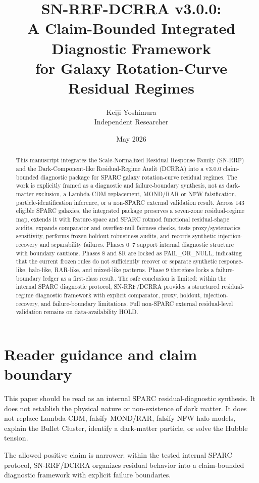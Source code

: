 \documentclass[11pt]{article}
\title{SN-RRF-DCRRA v3.0.0:\\A Claim-Bounded Integrated Diagnostic Framework\\for Galaxy Rotation-Curve Residual Regimes}
\author{Keiji Yoshimura\\Independent Researcher}
\date{May 2026}
\newcommand{\RR}{SN-RRF/DCRRA}
\begin{document}
\maketitle

\begin{abstract}
This manuscript integrates the Scale-Normalized Residual Response Family (SN-RRF) and the Dark-Component-like Residual-Regime Audit (DCRRA) into a v3.0.0 claim-bounded diagnostic package for SPARC galaxy rotation-curve residual regimes. The work is explicitly framed as a diagnostic and failure-boundary synthesis, not as dark-matter exclusion, a Lambda-CDM replacement, MOND/RAR or NFW falsification, particle-identification inference, or a non-SPARC external validation result. Across 143 eligible SPARC galaxies, the integrated package preserves a seven-zone residual-regime map, extends it with feature-space and SPARC rotmod functional residual-shape audits, expands comparator and overflex-null fairness checks, tests proxy/systematics sensitivity, performs frozen holdout robustness audits, and records synthetic injection-recovery and separability failures. Phases 0--7 support internal diagnostic structure with boundary cautions. Phases 8 and 8R are locked as FAIL_OR_NULL, indicating that the current frozen rules do not sufficiently recover or separate synthetic response-like, halo-like, RAR-like, and mixed-like patterns. Phase 9 therefore locks a failure-boundary ledger as a first-class result. The safe conclusion is limited: within the internal SPARC diagnostic protocol, \RR{} provides a structured residual-regime diagnostic framework with explicit comparator, proxy, holdout, injection-recovery, and failure-boundary limitations. Full non-SPARC external residual-level validation remains on data-availability HOLD.
\end{abstract}

\section{Reader guidance and claim boundary}
This paper should be read as an internal SPARC residual-diagnostic synthesis. It does not establish the physical nature or non-existence of dark matter. It does not replace Lambda-CDM, falsify MOND/RAR, falsify NFW halo models, explain the Bullet Cluster, identify a dark-matter particle, or solve the Hubble tension.

The allowed positive claim is narrower: within the tested internal SPARC protocol, \RR{} organizes residual behavior into a claim-bounded diagnostic framework with explicit failure boundaries.
\end{document}
